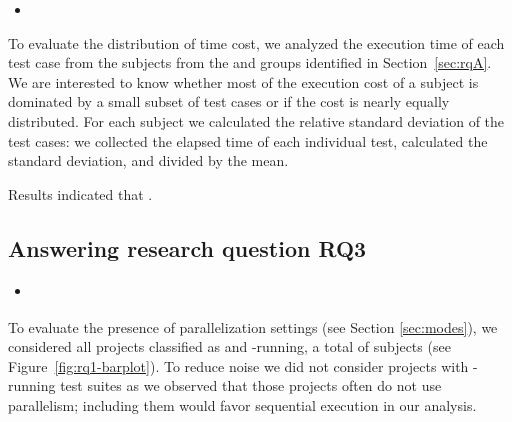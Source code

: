 \begin{itemize}
    \item \emph{\RQB}
\end{itemize}

To evaluate the distribution of time cost, we analyzed the execution
time of each test case from the \numMedLong{} subjects from the
\longg{} and \medg{} groups identified in Section~\ref{sec:rqA}. We
are interested to know whether most of the execution cost of a subject
is dominated by a small subset of test cases or if the cost is nearly
equally distributed. For each subject we calculated the relative
standard deviation of the test cases: we collected the elapsed time of
each individual test, calculated the standard deviation, and divided
by the mean. 

Results indicated that . 


\subsection{Answering research question RQ3}
\label{sec:rqC}

\begin{itemize}
    \item \emph{\RQC}
\end{itemize}

To evaluate the presence of parallelization settings (see Section
\ref{sec:modes}), we considered all projects classified as \medg{} and
\longg{}-running, a total of \numMedLong{} subjects (see
Figure~\ref{fig:rq1-barplot}). To reduce noise we did not consider
projects with \shortg{}-running test suites as we observed that those projects often do not use
parallelism; including them would favor sequential execution in our
analysis.

